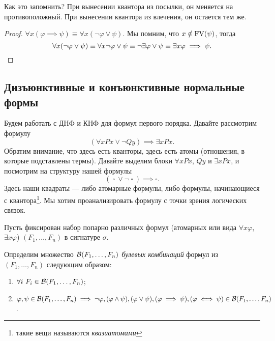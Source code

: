 Как это запомнить?
При вынесении квантора из посылки, он меняется на противоположный.
При вынесении квантора из влечения, он остается тем же.

\begin{proof}
    $\forall x (\varphi \implies \psi) \equiv \forall x (\neg \varphi \lor \psi)$.
    Мы помним, что $x \notin \mathrm{FV}(\psi)$, тогда
    \begin{equation*}
        \forall x (\neg \varphi \lor \psi) \equiv \forall x \neg \varphi \lor \psi \equiv \neg \exists \varphi \lor \psi \equiv \exists x \varphi \implies \psi.
        \qedhere
    \end{equation*}
\end{proof}

\subsection{Дизъюнктивные и конъюнктивные нормальные формы}

Будем работать с ДНФ и КНФ для формул первого порядка.
Давайте рассмотрим формулу
$$
    (\forall x Px \lor \neg Qy) \implies \exists x Px.
$$
Обратим внимание, что здесь есть кванторы, здесь есть атомы (отношения, в которые подставлены термы).
Давайте выделим блоки $\forall x Px$, $Qy$ и $\exists x P x$, и посмотрим на структуру нашей формулы
$$
    (~\square~ \lor \neg~\square~) \implies \square.
$$
Здесь наши квадраты --- либо атомарные формулы, либо формулы, начинающиеся с квантора\footnote{такие вещи называются {\it квазиатомами}}.
Мы хотим проанализировать формулу с точки зрения логических связок.

Пусть фиксирован набор попарно различных формул (атомарных или вида $\forall x \varphi$, $\exists x \varphi$) $(F_{1}, \ldots, F_{n})$ в сигнатуре $\sigma$.
\begin{definition}
    Определим множество $\mathcal{B}(F_{1}, \ldots, F_{n})$ {\it булевых комбинаций} формул из $(F_{1}, \ldots, F_{n})$ следующим образом:
    \begin{enumerate}
        \item $\forall i~F_{i} \in \mathcal{B}(F_{1}, \ldots, F_{n})$;
        \item $\varphi, \psi \in \mathcal{B}(F_{1}, \ldots, F_{n}) \implies \neg \varphi, (\varphi \land \psi), (\varphi \lor \psi), (\varphi \implies \psi), (\varphi \iff \psi) \in \mathcal{B}(F_{1}, \ldots, F_{n})$.
    \end{enumerate}
\end{definition}

